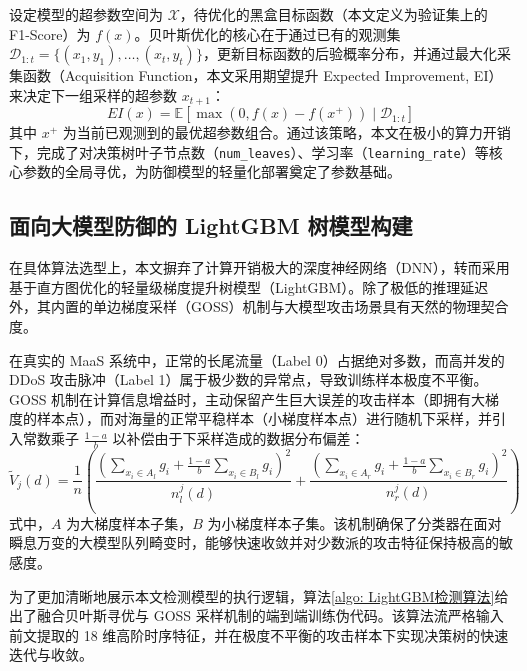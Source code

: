 \documentclass[master, vlined]{DissertUESTC}
\begin{document}
	设定模型的超参数空间为 $\mathcal{X}$，待优化的黑盒目标函数（本文定义为验证集上的 F1-Score）为 $f(x)$。贝叶斯优化的核心在于通过已有的观测集 $\mathcal{D}_{1:t} = \{(x_1, y_1), \dots, (x_t, y_t)\}$，更新目标函数的后验概率分布，并通过最大化采集函数（Acquisition Function，本文采用期望提升 Expected Improvement, EI）来决定下一组采样的超参数 $x_{t+1}$：
	\begin{equation}
		EI(x) = \mathbb{E} \left[ \max(0, f(x) - f(x^+)) \mid \mathcal{D}_{1:t} \right]
	\end{equation}
	其中 $x^+$ 为当前已观测到的最优超参数组合。通过该策略，本文在极小的算力开销下，完成了对决策树叶子节点数（\texttt{num\_leaves}）、学习率（\texttt{learning\_rate}）等核心参数的全局寻优，为防御模型的轻量化部署奠定了参数基础。

	\subsection{面向大模型防御的 LightGBM 树模型构建}
	在具体算法选型上，本文摒弃了计算开销极大的深度神经网络（DNN），转而采用基于直方图优化的轻量级梯度提升树模型（LightGBM）\cite{LightGBM高效梯度提升决策树}。除了极低的推理延迟外，其内置的单边梯度采样（GOSS）机制与大模型攻击场景具有天然的物理契合度。

	在真实的 MaaS 系统中，正常的长尾流量（Label 0）占据绝对多数，而高并发的 DDoS 攻击脉冲（Label 1）属于极少数的异常点，导致训练样本极度不平衡。GOSS 机制在计算信息增益时，主动保留产生巨大误差的攻击样本（即拥有大梯度的样本点），而对海量的正常平稳样本（小梯度样本点）进行随机下采样，并引入常数乘子 $\frac{1-a}{b}$ 以补偿由于下采样造成的数据分布偏差：
	\begin{equation}
		\tilde{V}_j(d) = \frac{1}{n} \left( \frac{\left( \sum_{x_i \in A_l} g_i + \frac{1-a}{b} \sum_{x_i \in B_l} g_i \right)^2}{n_l^j(d)} + \frac{\left( \sum_{x_i \in A_r} g_i + \frac{1-a}{b} \sum_{x_i \in B_r} g_i \right)^2}{n_r^j(d)} \right)
	\end{equation}
	式中，$A$ 为大梯度样本子集，$B$ 为小梯度样本子集。该机制确保了分类器在面对瞬息万变的大模型队列畸变时，能够快速收敛并对少数派的攻击特征保持极高的敏感度。


	为了更加清晰地展示本文检测模型的执行逻辑，算法\ref{algo: LightGBM检测算法}给出了融合贝叶斯寻优与 GOSS 采样机制的端到端训练伪代码。该算法流严格输入前文提取的 18 维高阶时序特征，并在极度不平衡的攻击样本下实现决策树的快速迭代与收敛。
\end{document}
